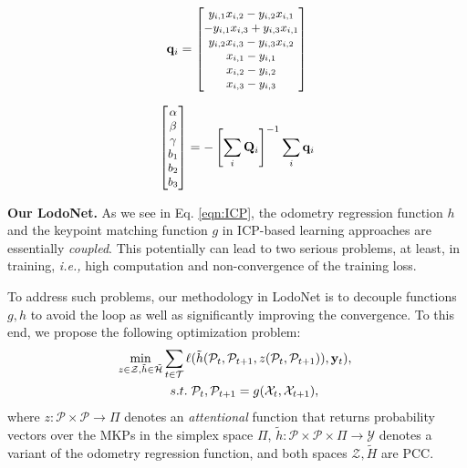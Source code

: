 \documentclass[sigconf]{acmart}
\def\ie{\emph{i.e., }}
\def\lodo{LodoNet}
\newcommand{\bfsection}[1]{\vspace*{0.1cm}\noindent\textbf{#1.}}
\begin{document}
\begin{align}
\small
    \mathbf{q}_i = 
    \begin{bmatrix}
        y_{i,1}x_{i,2} - y_{i,2}x_{i,1} \\
        -y_{i,1}x_{i,3} + y_{i,3}x_{i,1} \\
        y_{i,2}x_{i,3} - y_{i,3}x_{i,2} \\
        x_{i,1} - y_{i,1} \\
        x_{i,2} - y_{i,2} \\
        x_{i,3} - y_{i,3}
    \end{bmatrix}
\end{align}

\begin{align}
\small
    \begin{bmatrix}
        \alpha\\
        \beta\\
        \gamma\\
        b_1\\
        b_2\\
        b_3
    \end{bmatrix}=-\left[\sum_i\mathbf{Q}_i\right]^{-1}\sum_i\mathbf{q}_i
\end{align}


\bfsection{Our \lodo{}}
As we see in Eq. \ref{eqn:ICP}, the odometry regression function $h$ and the keypoint matching function $g$ in ICP-based learning approaches are essentially {\em coupled}. This potentially can lead to two serious problems, at least, in training, \ie high computation and non-convergence of the training loss.

To address such problems, our methodology in \lodo{} is to decouple functions $g, h$ to avoid the loop as well as significantly improving the convergence. To this end, we propose the following optimization problem:
\begin{align}\label{eqn:lodonet}
\small
    \min_{z\in\mathcal{Z},  \Tilde{h}\in\tilde{\mathcal{H}}}  \sum_{t\in\mathcal{T}}\ell & (\tilde{h}(\mathcal{P}_{t},  \mathcal{P}_{t+1}, z(\mathcal{P}_{t}, \mathcal{P}_{t+1})), \mathbf{y}_{t}), \; \notag \\
    s.t. \;& \mathcal{P}_{t}, \mathcal{P}_{t+1} = g(\mathcal{X}_{t}, \mathcal{X}_{t+1}), 
\end{align}
where $z:\mathcal{P}\times\mathcal{P}\rightarrow\Pi$ denotes an {\em attentional} function that returns probability vectors over the MKPs in the simplex space $\Pi$, $\tilde{h}:\mathcal{P}\times\mathcal{P}\times\Pi\rightarrow\mathcal{Y}$ denotes a variant of the odometry regression function, and both spaces $\mathcal{Z}, \tilde{H}$ are PCC.
\end{document}
